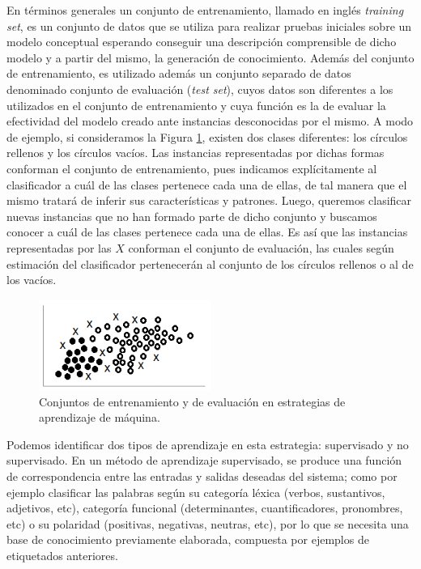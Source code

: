 {En t\'erminos generales un conjunto de entrenamiento, llamado en ingl\'es \textit{training set}, es un conjunto de datos que se utiliza para realizar pruebas iniciales sobre un modelo conceptual esperando conseguir una descripci\'on comprensible de dicho modelo y a partir del mismo, la generaci\'on de conocimiento. Adem\'as del conjunto de entrenamiento, es utilizado adem\'as un conjunto separado de datos denominado conjunto de evaluaci\'on (\textit{test set}), cuyos datos son diferentes a los utilizados en el conjunto de entrenamiento y cuya funci\'on es la de evaluar la efectividad del modelo creado ante instancias desconocidas por el mismo. A modo de ejemplo, si consideramos la Figura \ref{datasets}, existen dos clases diferentes: los c\'irculos rellenos y los c\'irculos vac\'ios. Las instancias representadas por dichas formas conforman el conjunto de entrenamiento, pues indicamos expl\'icitamente al clasificador a cu\'al de las clases pertenece cada una de ellas, de tal manera que el mismo tratar\'a de inferir sus caracter\'isticas y patrones. Luego, queremos clasificar nuevas instancias que no han formado parte de dicho conjunto y buscamos conocer a cu\'al de las clases pertenece cada una de ellas. Es as\'i que las instancias representadas por las $X$ conforman el conjunto de evaluaci\'on, las cuales seg\'un estimaci\'on del clasificador pertenecer\'an al conjunto de los c\'irculos rellenos o al de los vac\'ios.
\newline

\begin{figure}[h]
\centering
\includegraphics[width=0.5\textwidth]{datasets.png}
\caption{Conjuntos de entrenamiento y de evaluaci\'on en estrategias de aprendizaje de m\'aquina.}
\label{datasets}
\end{figure}

Podemos identificar dos tipos de aprendizaje en esta estrategia: supervisado y no supervisado. En un m\'etodo de aprendizaje supervisado, se produce una funci\'on de correspondencia entre las entradas y salidas deseadas del sistema; como por ejemplo clasificar las palabras seg\'un su categor\'ia l\'exica (verbos, sustantivos, adjetivos, etc), categor\'ia funcional (determinantes, cuantificadores, pronombres, etc) o su polaridad (positivas, negativas, neutras, etc), por lo que se necesita una base de conocimiento previamente elaborada, compuesta por ejemplos de etiquetados anteriores.
\newline

}
